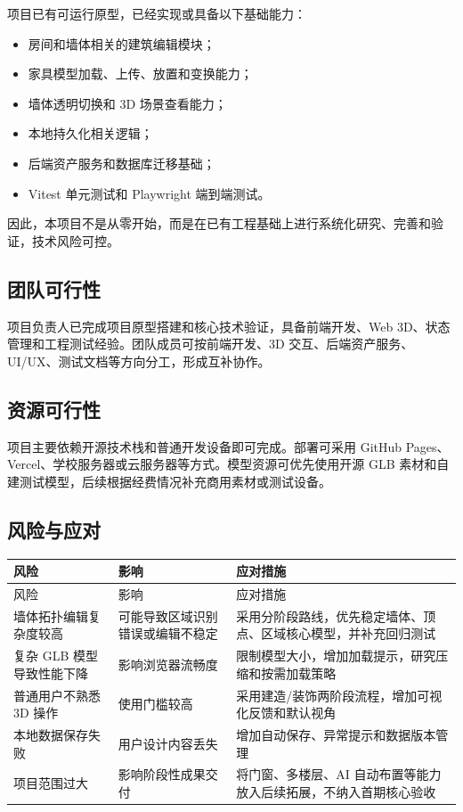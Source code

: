 \documentclass[UTF8,fontset=fandol,zihao=-4]{ctexart}
\begin{document}
项目已有可运行原型，已经实现或具备以下基础能力：

\begin{itemize}
  \item 房间和墙体相关的建筑编辑模块；
  \item 家具模型加载、上传、放置和变换能力；
  \item 墙体透明切换和 3D 场景查看能力；
  \item 本地持久化相关逻辑；
  \item 后端资产服务和数据库迁移基础；
  \item Vitest 单元测试和 Playwright 端到端测试。
\end{itemize}

因此，本项目不是从零开始，而是在已有工程基础上进行系统化研究、完善和验证，技术风险可控。

\subsection{团队可行性}

项目负责人已完成项目原型搭建和核心技术验证，具备前端开发、Web 3D、状态管理和工程测试经验。团队成员可按前端开发、3D 交互、后端资产服务、UI/UX、测试文档等方向分工，形成互补协作。

\subsection{资源可行性}

项目主要依赖开源技术栈和普通开发设备即可完成。部署可采用 GitHub Pages、Vercel、学校服务器或云服务器等方式。模型资源可优先使用开源 GLB 素材和自建测试模型，后续根据经费情况补充商用素材或测试设备。

\subsection{风险与应对}

\begin{longtable}{P{3.8cm}P{4cm}P{7.2cm}}
\toprule
风险 & 影响 & 应对措施 \\
\midrule
\endfirsthead
\toprule
风险 & 影响 & 应对措施 \\
\midrule
\endhead
墙体拓扑编辑复杂度较高 & 可能导致区域识别错误或编辑不稳定 & 采用分阶段路线，优先稳定墙体、顶点、区域核心模型，并补充回归测试 \\
复杂 GLB 模型导致性能下降 & 影响浏览器流畅度 & 限制模型大小，增加加载提示，研究压缩和按需加载策略 \\
普通用户不熟悉 3D 操作 & 使用门槛较高 & 采用建造/装饰两阶段流程，增加可视化反馈和默认视角 \\
本地数据保存失败 & 用户设计内容丢失 & 增加自动保存、异常提示和数据版本管理 \\
项目范围过大 & 影响阶段性成果交付 & 将门窗、多楼层、AI 自动布置等能力放入后续拓展，不纳入首期核心验收 \\
\bottomrule
\end{longtable}
\end{document}
